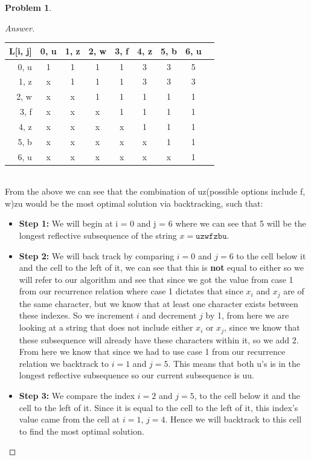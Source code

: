 \documentclass[11pt]{article}
\theoremstyle{definition}
\theoremstyle{definition}
\newtheorem{required}{Problem}
\theoremstyle{definition}
\begin{document}
\begin{required}
\begin{enumerate}[label=(\alph*)]
\begin{proof}[Answer]
\begin{tabular}{|r|c|c|c|c|c|c|c|c|}
\hline
L[i, j]& 0, u& 1, z& 2, w& 3, f& 4, z& 5, b& 6, u \\ 
 \hline
0, u & 1 & 1 & 1 & 1 & 3 & 3 & 5  \\ 
\hline
1, z& x& 1 & 1 & 1 & 3 & 3 & 3   \\ 
\hline
2, w & x & x & 1 & 1 & 1 & 1 & 1   \\ 
\hline
3, f& x & x & x & 1 & 1 & 1 & 1   \\ 
\hline
4, z& x & x & x & x & 1 & 1 & 1   \\ 
\hline
5, b& x & x & x & x & x & 1 & 1   \\ 
\hline
6, u& x & x & x & x & x & x & 1   \\ 
\hline
\end{tabular} \\

From the above we can see that the combination of uz(possible options include f, w)zu would be the most optimal solution via backtracking, such that: \\
\begin {itemize}
\item \textbf{Step 1:} We will begin at i = 0 and j = 6 where we can see that 5 will be the longest reflective subsequence of the string $x = \texttt{uzwfzbu} $. \\

\item \textbf{Step 2:} We will back track by comparing $i = 0$ and $j = 6$ to the cell below it and the cell to the left of it, we can see that this is \textbf{not} equal to either so we will refer to our algorithm and see that since we got the value from case 1 from our recurrence relation where case 1 dictates that since $x_i$ and $x_j$ are of the same character, but we know that at least one character exists between these indexes. So we increment $i$ and decrement $j$ by 1, from here we are looking at a string that does not include either $x_i$ or $x_j$, since we know that these subsequence will already have these characters within it, so we add 2. From here we know that since we had to use case 1 from our recurrence relation we backtrack to $i = 1$ and $j = 5$. This means that both u's is in the longest reflective subsequence so our current subsequence is uu.\\

\item \textbf{Step 3:} We compare the index  $i = 2$ and $j = 5$, to the cell below it and the cell to the left of it. Since it is equal to the cell to the left of it, this index's value came from the cell at $i=1$, $j=4$. Hence we will backtrack to this cell to find the most optimal solution. \\


\end{itemize}
\end{proof}
\end{enumerate}
\end{required}
\end{document}
